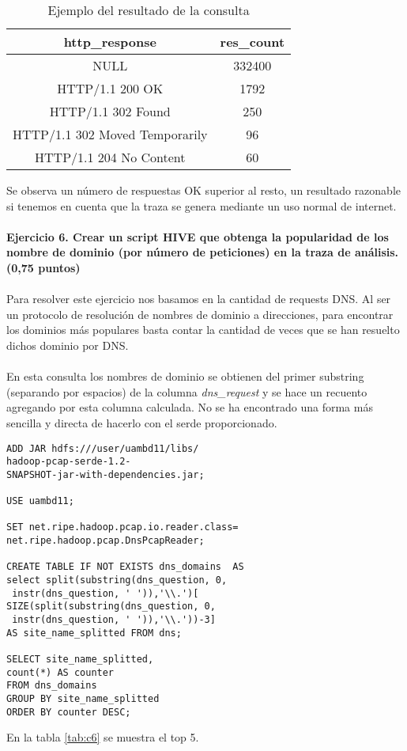 \begin{table}[ht]
	\centering
	\caption{Ejemplo del resultado de la consulta}
	\begin{tabular}[t]{cc}
		http\_response & res\_count \\
		\hline
		NULL &	332400\\
		HTTP/1.1 200 OK&	1792\\
		HTTP/1.1 302 Found&	250\\
		HTTP/1.1 302 Moved Temporarily&	96\\
		HTTP/1.1 204 No Content&	60\\
	\end{tabular}
	\label{tab:c5}
\end{table}%
Se observa un número de respuestas OK superior al resto, un resultado razonable si tenemos en cuenta que la traza se genera mediante un uso normal de internet.\\\\
\textbf{Ejercicio 6. Crear un script HIVE que obtenga la popularidad de los nombre de dominio (por número de
	peticiones) en la traza de análisis. (0,75 puntos)}\\\\
Para resolver este ejercicio nos basamos en la cantidad de requests DNS. Al ser un protocolo de resolución de nombres de dominio a direcciones, para encontrar los dominios más populares basta contar la cantidad de veces que se han resuelto dichos dominio por DNS.\\\\
En esta consulta los nombres de dominio se obtienen del primer substring (separando por espacios) de la columna \textit{dns\_request} y se hace un recuento agregando por esta columna calculada. No se ha encontrado una forma más sencilla y directa de hacerlo con el serde proporcionado.
\begin{lstlisting}[caption=Consulta para obtener el ranking de dominios]
ADD JAR hdfs:///user/uambd11/libs/
hadoop-pcap-serde-1.2-
SNAPSHOT-jar-with-dependencies.jar;
	
USE uambd11;

SET net.ripe.hadoop.pcap.io.reader.class=
net.ripe.hadoop.pcap.DnsPcapReader;

CREATE TABLE IF NOT EXISTS dns_domains  AS
select split(substring(dns_question, 0,
 instr(dns_question, ' ')),'\\.')[
SIZE(split(substring(dns_question, 0,
 instr(dns_question, ' ')),'\\.'))-3] 
AS site_name_splitted FROM dns;

SELECT site_name_splitted,
count(*) AS counter 
FROM dns_domains 
GROUP BY site_name_splitted 
ORDER BY counter DESC;
\end{lstlisting}
En la tabla \ref{tab:c6} se muestra el top 5.

